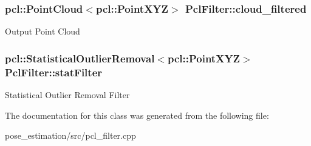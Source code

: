 \subsubsection[{\texorpdfstring{cloud\+\_\+filtered}{cloud_filtered}}]{\setlength{\rightskip}{0pt plus 5cm}pcl\+::\+Point\+Cloud$<$pcl\+::\+Point\+X\+YZ$>$ Pcl\+Filter\+::cloud\+\_\+filtered\hspace{0.3cm}{\ttfamily [private]}}\hypertarget{classPclFilter_a06aae25878fdd6c3aad05fa00f4c0f07}{}\label{classPclFilter_a06aae25878fdd6c3aad05fa00f4c0f07}
Output Point Cloud 
\subsubsection[{\texorpdfstring{stat\+Filter}{statFilter}}]{\setlength{\rightskip}{0pt plus 5cm}pcl\+::\+Statistical\+Outlier\+Removal$<$pcl\+::\+Point\+X\+YZ$>$ Pcl\+Filter\+::stat\+Filter\hspace{0.3cm}{\ttfamily [private]}}\hypertarget{classPclFilter_a8e402978eb3fdedcbee54554fe55c259}{}\label{classPclFilter_a8e402978eb3fdedcbee54554fe55c259}
Statistical Outlier Removal Filter 

The documentation for this class was generated from the following file\+:\begin{DoxyCompactItemize}
\item 
pose\+\_\+estimation/src/pcl\+\_\+filter.\+cpp\end{DoxyCompactItemize}
